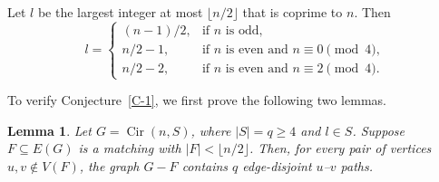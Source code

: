 \documentclass{article}
\newtheorem{lemma}[theorem]{Lemma}
\begin{document}
Let \(l\) be the largest integer at most \(\lfloor n/2\rfloor\) that is coprime to \(n\). Then
\[
l = 
\begin{cases}
(n-1)/2, & \text{if } n \text{ is odd},\\ 
n/2 - 1, & \text{if } n \text{ is even and } n \equiv 0 \pmod{4},\\ 
n/2 - 2, & \text{if } n \text{ is even and } n \equiv 2 \pmod{4}.
\end{cases}
\]

To verify Conjecture~\ref{C-1}, we first prove the following two lemmas.

\begin{lemma}\label{ML-1001}
Let \(G=\operatorname{Cir}(n,S)\), where \(|S|=q\ge 4\) and \(l\in S\). Suppose \(F\subseteq E(G)\) is a matching with \(|F|<\lfloor n/2\rfloor\). Then, for every pair of vertices \(u,v\notin V(F)\), the graph \(G-F\) contains \(q\) edge-disjoint \(u\)--\(v\) paths.
\end{lemma}
\end{document}
